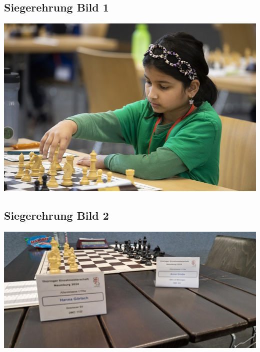 
\subsection{Siegerehrung Bild 1}
\begin{center}
    \includegraphics[width=\linewidth,height=0.5625\linewidth,keepaspectratio]{THJEM2.jpg}
    \label{fig:Kashvi Bild}
\end{center}

\subsection{Siegerehrung Bild 2}
\begin{center}
    \includegraphics[width=\linewidth,height=0.5625\linewidth,keepaspectratio]{THJEM1.jpeg}
    \label{fig:THJEM Hanna Schild}
\end{center}